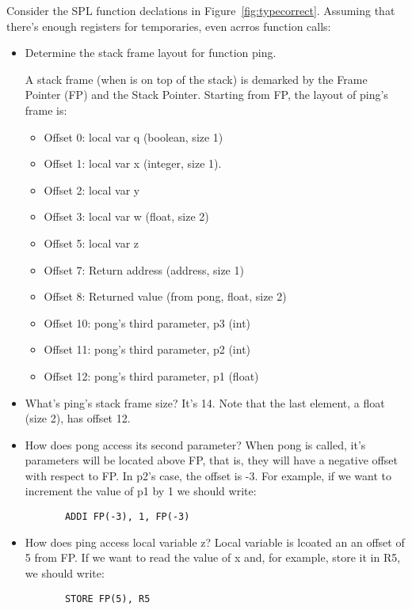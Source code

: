 \documentclass{article}
\begin{document}
Consider the SPL function declations in Figure~\ref{fig:typecorrect}. Assuming that there's enough registers for temporaries, even acrros function calls:
\begin{itemize}
\item Determine the stack frame layout for function ping.

A stack frame (when is on top of the stack) is demarked by the Frame Pointer (FP) and the Stack Pointer. Starting from FP, the layout of ping's frame is:
\begin{itemize}
\item Offset 0: local var q (boolean, size 1)
\item Offset 1: local var x (integer, size 1). 
\item Offset 2: local var y 
\item Offset 3: local var w (float, size 2)
\item Offset 5: local var z 
\item Offset 7: Return address (address, size 1)
\item Offset 8: Returned value (from pong, float, size 2)
\item Offset 10: pong's third parameter, p3 (int)
\item Offset 11: pong's third parameter, p2 (int) 
\item Offset 12: pong's third parameter, p1 (float)
\end{itemize}  

\item What's ping's stack frame size? It's 14. Note that the last element, a float (size 2), has offset 12.

\item How does pong access its second parameter? When pong is called, it's parameters will be located above FP, that is, they will have a negative offset with respect to FP. In p2's case, the offset is -3. For example, if we want to increment the value of p1 by 1 we should write:
\begin{verbatim}
       ADDI FP(-3), 1, FP(-3)
\end{verbatim}

\item How does ping access local variable z? Local variable is lcoated an an offset of 5 from FP. If we want to read the value of x and, for example, store it in R5, we should write:

\begin{verbatim}
       STORE FP(5), R5
\end{verbatim}

\end{itemize}
\end{document}
